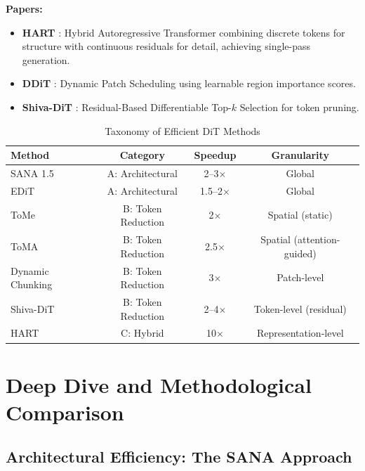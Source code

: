 \documentclass{article}
\begin{document}
\textbf{Papers:}
\begin{itemize}
    \item \textbf{HART} \cite{tang2024hart}: Hybrid Autoregressive Transformer
          combining discrete tokens for structure with continuous residuals for
          detail, achieving single-pass generation.
    \item \textbf{DDiT} \cite{kim2026ddit}: Dynamic Patch Scheduling using
          learnable region importance scores.
    \item \textbf{Shiva-DiT} \cite{zhang2026shiva}: Residual-Based
          Differentiable Top-$k$ Selection for token pruning.
\end{itemize}

\begin{table}[h]
    \centering
    \caption{Taxonomy of Efficient DiT Methods}
    \label{tab:taxonomy}
    \begin{tabular}{@{}lccc@{}}
        \toprule
        \textbf{Method}  & \textbf{Category}  & \textbf{Speedup} & \textbf{Granularity}       \\
        \midrule
        SANA 1.5         & A: Architectural   & 2--3$\times$     & Global                     \\
        EDiT             & A: Architectural   & 1.5--2$\times$   & Global                     \\
        ToMe             & B: Token Reduction & 2$\times$        & Spatial (static)           \\
        ToMA             & B: Token Reduction & 2.5$\times$      & Spatial (attention-guided) \\
        Dynamic Chunking & B: Token Reduction & 3$\times$        & Patch-level                \\
        Shiva-DiT        & B: Token Reduction & 2--4$\times$     & Token-level (residual)     \\
        HART             & C: Hybrid          & 10$\times$       & Representation-level       \\
        \bottomrule
    \end{tabular}
\end{table}

\section{Deep Dive and Methodological Comparison}

\subsection{Architectural Efficiency: The SANA Approach}
\end{document}
